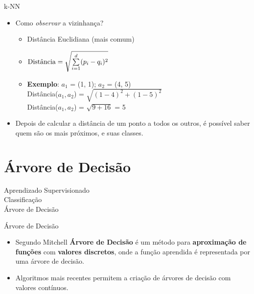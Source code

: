 \documentclass{libs/ufc_format}
\begin{document}
\begin{frame}{k-NN}
    \begin{itemize}
        \justifying
        \item Como \textit{observar} a vizinhança?
            \begin{itemize}
                \justifying
                \item<2-> Distância Euclidiana (mais comum)
                \item<3-> $\hbox{Distância} = \sqrt{\sum\limits^{d}_{i=1}(p_{i} - q_{i})^2}$
                \item<4-> \textbf{Exemplo}: $a_{1}$ = (1, 1); $a_{2}$ = (4, 5)\\
                Distância($a_{1}, a_{2}$) = $\sqrt{(1 - 4)^2 + (1-5)^2}$\\
                Distância($a_{1}, a_{2}$) = $\sqrt{9 + 16}$ = 5
            \end{itemize}
        \item<5> Depois de calcular a distância de um ponto a todos os outros, é possível saber quem são os mais próximos, e suas classes.
    \end{itemize}
\end{frame}

\section{Árvore de Decisão}

\begin{frame}{}
    \centering
    \LARGE
    Aprendizado Supervisionado\\
    \vspace{0.5cm}
    \LARGE
    Classificação\\
    \vspace{0.5cm}
    \Large
    Árvore de Decisão
\end{frame}

\begin{frame}{Árvore de Decisão}
    \begin{itemize}
        \justifying
        \item Segundo Mitchell \cite{m97} \textbf{Árvore de Decisão} é um método para \textbf{aproximação de funções} com \alert<2>{\textbf{valores discretos}}, onde a função aprendida é representada por uma árvore de decisão.
        \item<2> Algoritmos mais recentes permitem a criação de árvores de decisão com valores contínuos.
    \end{itemize}
\end{frame}
\end{document}
